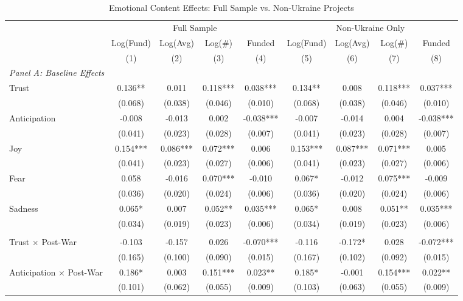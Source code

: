 \begin{table}[htbp]
\centering
\caption{Emotional Content Effects: Full Sample vs. Non-Ukraine Projects}
\label{tab:emotions}
\begin{threeparttable}
\small
\begin{tabular}{lcccccccc}
\toprule
& \multicolumn{4}{c}{Full Sample} & \multicolumn{4}{c}{Non-Ukraine Only} \\
\cmidrule(lr){2-5} \cmidrule(lr){6-9}
& Log(Fund) & Log(Avg) & Log(\#) & Funded & Log(Fund) & Log(Avg) & Log(\#) & Funded \\
& (1) & (2) & (3) & (4) & (5) & (6) & (7) & (8) \\
\midrule
\multicolumn{9}{l}{\textit{Panel A: Baseline Effects}} \\
Trust & 0.136** & 0.011 & 0.118*** & 0.038*** & 0.134** & 0.008 & 0.118*** & 0.037*** \\
& (0.068) & (0.038) & (0.046) & (0.010) & (0.068) & (0.038) & (0.046) & (0.010) \\
Anticipation & -0.008 & -0.013 & 0.002 & -0.038*** & -0.007 & -0.014 & 0.004 & -0.038*** \\
& (0.041) & (0.023) & (0.028) & (0.007) & (0.041) & (0.023) & (0.028) & (0.007) \\
Joy & 0.154*** & 0.086*** & 0.072*** & 0.006 & 0.153*** & 0.087*** & 0.071*** & 0.005 \\
& (0.041) & (0.023) & (0.027) & (0.006) & (0.041) & (0.023) & (0.027) & (0.006) \\
Fear & 0.058 & -0.016 & 0.070*** & -0.010 & 0.067* & -0.012 & 0.075*** & -0.009 \\
& (0.036) & (0.020) & (0.024) & (0.006) & (0.036) & (0.020) & (0.024) & (0.006) \\
Sadness & 0.065* & 0.007 & 0.052** & 0.035*** & 0.065* & 0.008 & 0.051** & 0.035*** \\
& (0.034) & (0.019) & (0.023) & (0.006) & (0.034) & (0.019) & (0.023) & (0.006) \\
\addlinespace
\multicolumn{9}{l}{\textit{Panel B: Post-War Interactions}} \\
Trust $\times$ Post-War & -0.103 & -0.157 & 0.026 & -0.070*** & -0.116 & -0.172* & 0.028 & -0.072*** \\
& (0.165) & (0.100) & (0.090) & (0.015) & (0.167) & (0.102) & (0.092) & (0.015) \\
Anticipation $\times$ Post-War & 0.186* & 0.003 & 0.151*** & 0.023** & 0.185* & -0.001 & 0.154*** & 0.022** \\
& (0.101) & (0.062) & (0.055) & (0.009) & (0.103) & (0.063) & (0.055) & (0.009) \\

\end{tabular}
\end{threeparttable}
\end{table}
